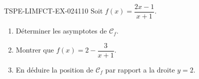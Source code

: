 \begin{exercice}{TSPE-LIMFCT-EX-024}{1}{10}
Soit $f(x) = \dfrac{2x-1}{x+1}$.
\begin{enumerate}
  \item Déterminer les asymptotes de $\mathcal{C}_f$.
  \item Montrer que $f(x) = 2 - \dfrac{3}{x+1}$.
  \item En déduire la position de $\mathcal{C}_f$ par rapport a la droite $y = 2$.
\end{enumerate}
\end{exercice}
